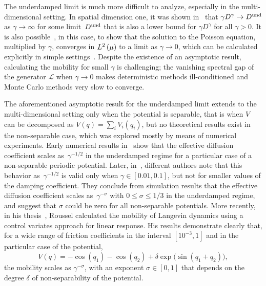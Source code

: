 \documentclass[11pt,a4paper]{article}
\theoremstyle{plain}
\numberwithin{equation}{section}
\renewcommand{\leq}{\leqslant}
\begin{document}
The underdamped limit is much more difficult to analyze,
especially in the multi-dimensional setting.
In spatial dimension one, it was shown in~\cite{MR2394704} that $\gamma D^{\gamma} \to D^{\rm und}$ as $\gamma \to \infty$ for some limit~$D^{\rm und}$
that is also a lower bound for $\gamma D^{\gamma}$ for all $\gamma > 0$.
It is also possible~\cite[Lemma 3.4]{MR2394704}, in this case,
to show that the solution to the Poisson equation,
multiplied by $\gamma$, converges in $\lp{2}{\mu}$ to a limit as $\gamma \to 0$,
which can be calculated explicitly in simple settings~\cite{MR2427108}.
Despite the existence of an asymptotic result,
calculating the mobility for small $\gamma$ is challenging;
the vanishing spectral gap of the generator $\mathcal L$ when $\gamma \to 0$ makes deterministic methods ill-conditioned
and Monte Carlo methods very slow to converge.

The aforementioned asymptotic result for the underdamped limit extends to the multi-dimensional setting only when the potential is separable,
that is when $V$ can be decomposed as $V(q) = \sum_i V_i(q_i)$,
but no theoretical results exist in the non-separable case,
which was explored mostly by means of numerical experiments.
Early numerical results in~\cite{chen1996surface} show that the effective diffusion coefficient scales as~$\gamma^{-1/2}$ in the underdamped regime for a particular case of a non-separable periodic potential.
Later, in~\cite{Braun02},
different authors note that this behavior as~$\gamma^{-1/2}$ is valid only when $\gamma \in [0.01, 0.1]$,
but not for smaller values of the damping coefficient.
They conclude from simulation results that the effective diffusion coefficient scales as~$\gamma^{-\sigma}$ with $0 \leq \sigma \leq 1/3$ in the underdamped regime,
and suggest that $\sigma$ could be zero for all non-separable potentials.
More recently, in his thesis~\cite{roussel_thesis},
Roussel calculated the mobility of Langevin dynamics  using a control variates approach for linear response.
His results demonstrate clearly that, for a wide range of friction coefficients in the interval $[10^{-3}, 1]$ and in the particular case of the potential,
\[
    V(q) = - \cos(q_1) - \cos(q_2) + \delta \exp \bigl(\sin(q_1 + q_2)\bigr),
\]
the mobility scales as $\gamma^{- \sigma}$,
with an exponent $\sigma \in [0, 1]$ that depends on the degree $\delta$ of non-separability of the potential.
\end{document}
